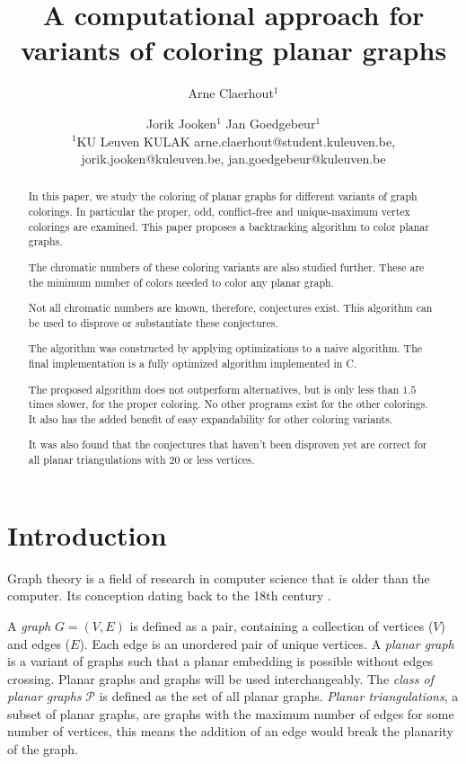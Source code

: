 \documentclass{article}
\title{A computational approach for variants of coloring planar graphs}
\author{
	Arne Claerhout$^1$\and
	Jorik Jooken$^1$\And
	Jan Goedgebeur$^1$\\
	\affiliations
	$^1$KU Leuven KULAK
	\emails
	arne.claerhout@student.kuleuven.be,
	jorik.jooken@kuleuven.be,
	jan.goedgebeur@kuleuven.be
}
\begin{document}
	
\maketitle

\begin{abstract}
	In this paper, we study the coloring of planar graphs for different variants of graph colorings. In particular the proper, odd, conflict-free and unique-maximum vertex colorings are examined. This paper proposes a backtracking algorithm to color planar graphs.
	
	The chromatic numbers of these coloring variants are also studied further. These are the minimum number of colors needed to color any planar graph.
	
	Not all chromatic numbers are known, therefore, conjectures exist. This algorithm can be used to disprove or substantiate these conjectures.
	
	The algorithm was constructed by applying optimizations to a naive algorithm. The final implementation is a fully optimized algorithm implemented in C.
	
	The proposed algorithm does not outperform alternatives, but is only less than $1.5$ times slower, for the proper coloring. No other programs exist for the other colorings. It also has the added benefit of easy expandability for other coloring variants.
	
	It was also found that the conjectures that haven't been disproven yet are correct for all planar triangulations with $20$ or less vertices. 
	
\end{abstract}

\section{Introduction}

Graph theory is a field of research in computer science that is older than the computer. Its conception dating back to the 18th century \cite{euler1741solutio}. 

A \textit{graph} $G = (V, E)$ is defined as a pair, containing a collection of vertices ($V$) and edges ($E$). Each edge is an unordered pair of unique vertices. A \textit{planar graph} is a variant of graphs such that a planar embedding is possible without edges crossing. Planar graphs and graphs will be used interchangeably. The \textit{class of planar graphs} $\mathcal{P}$ is defined as the set of all planar graphs. \textit{Planar triangulations}, a subset of planar graphs, are graphs with the maximum number of edges for some number of vertices, this means the addition of an edge would break the planarity of the graph.
\end{document}
